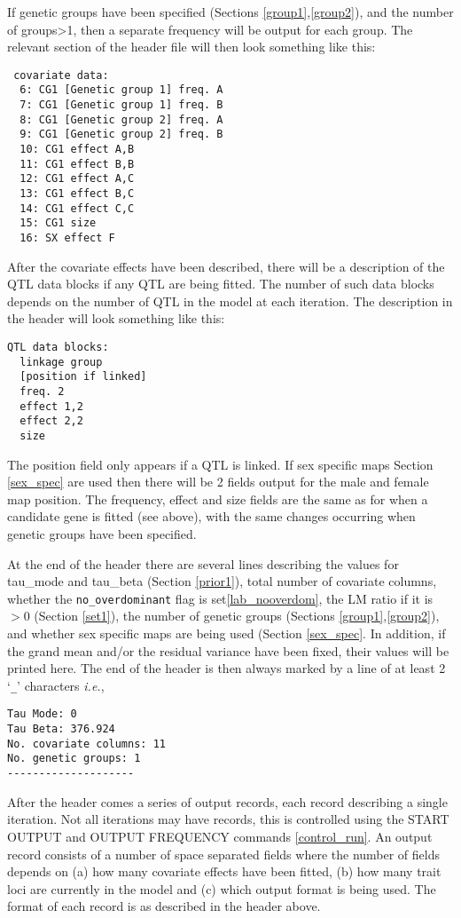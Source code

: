 \documentclass[10pt,a4paper]{article}
\newcommand{\IE}{\textit{i.e.},\xspace}
\begin{document}
If genetic groups have been specified (Sections
\ref{group1},\ref{group2}), and the number of groups>1, then a separate
frequency will be output for each group.  The relevant section of the header
file will then look something like this:
\begin{verbatim}
 covariate data:
  6: CG1 [Genetic group 1] freq. A
  7: CG1 [Genetic group 1] freq. B
  8: CG1 [Genetic group 2] freq. A
  9: CG1 [Genetic group 2] freq. B
  10: CG1 effect A,B
  11: CG1 effect B,B
  12: CG1 effect A,C
  13: CG1 effect B,C
  14: CG1 effect C,C
  15: CG1 size
  16: SX effect F
\end{verbatim}
After the covariate effects have been described, there will be a description
of the QTL data blocks if any QTL are being fitted.  The number of such data
blocks depends on the number of QTL in the model at each iteration.  The
description in the header will look something like this:
\begin{verbatim}
QTL data blocks:
  linkage group
  [position if linked]
  freq. 2
  effect 1,2
  effect 2,2
  size
\end{verbatim}
The position field only appears if a QTL is linked.  If sex specific maps
Section \ref{sex_spec} are used then there will be 2 fields output for the
male and female map position.  The frequency, effect and size fields are the
same as for when a candidate gene is fitted (see above), with
the same changes occurring when genetic groups have been specified.

At the end of the header there are several lines describing the values for
tau\_mode and tau\_beta (Section \ref{prior1}), total number of covariate
columns, whether the \verb+no_overdominant+ flag is set\ref{lab_nooverdom},
the LM ratio if it is $>0$ (Section \ref{set1}), the number of genetic groups (Sections
\ref{group1},\ref{group2}), and whether sex specific maps are being used (Section
\ref{sex_spec}.  In addition, if the grand mean and/or the residual variance
have been fixed, their values will be printed here.  The end of the header
is then always marked by a line of at least 2 `\verb+_+' characters \IE
\begin{verbatim}
Tau Mode: 0
Tau Beta: 376.924
No. covariate columns: 11
No. genetic groups: 1
--------------------
\end{verbatim}
After the header comes a series of output records, each record describing a
single iteration.  Not all iterations may have records, this is controlled
using the START OUTPUT and OUTPUT FREQUENCY commands \ref{control_run}.
An output record consists of a number of space separated fields where the
number of fields depends on (a) how many covariate effects have been fitted,
(b) how many trait loci are currently in the model and (c) which output
format is being used.  The format of each record is as described in the
header above.
\end{document}
